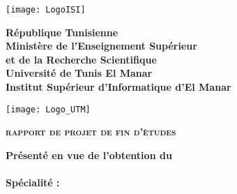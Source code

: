 


\thispagestyle{cover}%
\hspace{-47pt}
\begin{minipage}[l]{0.2\columnwidth}
\vspace{6mm}
\texttt{[image: LogoISI]}\\
\end{minipage}
\hfill
\begin{minipage}[l]{0.6\columnwidth}
\centering
\footnotesize
\textbf{{République Tunisienne}}\\
\vspace{1.5mm}
\textbf{{Ministère de l'Enseignement Supérieur\\
et de la Recherche Scientifique}}\\
\vspace{1.5mm}
\textbf{{Université de Tunis El Manar}}\\
\vspace{1.5mm}
\textbf{{Institut Supérieur d'Informatique d’El Manar}}
\end{minipage}
\hfill
\begin{minipage}[l]{0.02\columnwidth}
\end{minipage}
\hfill
\begin{minipage}[l]{0.18\columnwidth}
\vspace{6mm}
\texttt{[image: Logo\_UTM]}\\
\end{minipage}
\vskip1.5cm

\begin{center}
{\LARGE{\textbf{\textsc{rapport de projet de fin d'ètudes}}}}\\
\vskip0.5cm
\large

{\textbf{Présenté en vue de l'obtention du }}\\
\vskip2mm
{\textbf{\@diplomaName}}\\
{\textbf{Spécialité : \@speciality}}\\
{}
\end{center}

